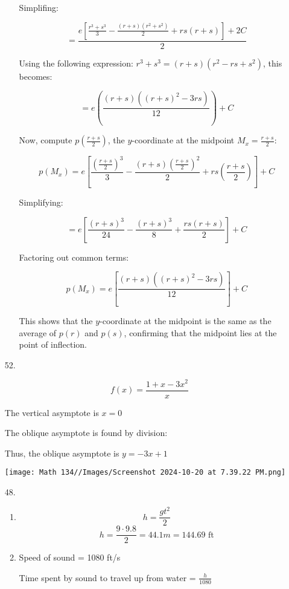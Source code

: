\documentclass[12pt]{article}
\begin{document}
\begin{enumerate}[start=1,label={\bfseries. },leftmargin=1in]
\begin{enumerate}
    Simplifing:

    \[
    = \frac{e\left[\frac{r^3 + s^3}{3} - \frac{(r+s)(r^2 + s^2)}{2} + rs(r+s)\right] + 2C}{2}
    \]

    Using the following expression: \( r^3 + s^3 = (r+s)(r^2 - rs + s^2) \), this becomes:

    \[
    = e\left(\frac{(r+s)((r+s)^2 - 3rs)}{12}\right) + C
    \]

    Now, compute \( p\left( \frac{r+s}{2} \right) \), the \( y \)-coordinate at the midpoint \( M_x = \frac{r+s}{2} \):

    \[
    p(M_x) = e\left[\frac{\left(\frac{r+s}{2}\right)^3}{3} - \frac{(r+s)\left(\frac{r+s}{2}\right)^2}{2} + rs\left(\frac{r+s}{2}\right)\right] + C
    \]

    Simplifying:

    \[
    = e\left[\frac{(r+s)^3}{24} - \frac{(r+s)^3}{8} + \frac{rs(r+s)}{2}\right] + C
    \]

    Factoring out common terms:

    \[
    p(M_x) = e\left[\frac{(r+s)((r+s)^2 - 3rs)}{12}\right] + C
    \]

    This shows that the \( y \)-coordinate at the midpoint is the same as the average of \( p(r) \) and \( p(s) \), confirming that the midpoint lies at the point of inflection.



\end{enumerate}

\item [52. ]

\[
f(x) = \frac{1+x-3x^2}{x}
\]

The vertical asymptote is $x=0$

The oblique asymptote is found by division:


\newpage
Thus, the oblique asymptote is $y=-3x+1$

\texttt{[image: Math 134//Images/Screenshot 2024-10-20 at 7.39.22 PM.png]}

\item [48. ]
\begin{enumerate}
    \item 
    \[
    h = \frac{gt^2}{2}
    \]
    \[
    h = \frac{9 \cdot 9.8}{2} = 44.1m = 144.69 \text{ ft}
    \]

    \item 
    Speed of sound = 1080 ft/s

    Time spent by sound to travel up from water = $\frac{h}{1080}$


\end{enumerate}
\end{enumerate}
\end{document}

